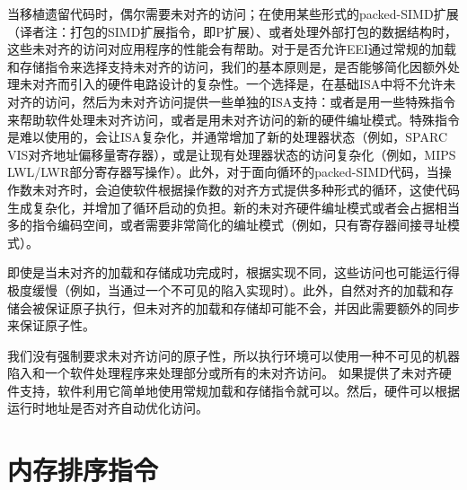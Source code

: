 \begin{commentary}

  当移植遗留代码时，偶尔需要未对齐的访问；在使用某些形式的packed-SIMD扩展（译者注：打包的SIMD扩展指令，即P扩展）、或者处理外部打包的数据结构时，这些未对齐的访问对应用程序的性能会有帮助。对于是否允许EEI通过常规的加载和存储指令来选择支持未对齐的访问，我们的基本原则是，是否能够简化因额外处理未对齐而引入的硬件电路设计的复杂性。一个选择是，在基础ISA中将不允许未对齐的访问，然后为未对齐访问提供一些单独的ISA支持：或者是用一些特殊指令来帮助软件处理未对齐访问，或者是用未对齐访问的新的硬件编址模式。特殊指令是难以使用的，会让ISA复杂化，并通常增加了新的处理器状态（例如，SPARC VIS对齐地址偏移量寄存器），或是让现有处理器状态的访问复杂化（例如，MIPS LWL/LWR部分寄存器写操作）。此外，对于面向循环的packed-SIMD代码，当操作数未对齐时，会迫使软件根据操作数的对齐方式提供多种形式的循环，这使代码生成复杂化，并增加了循环启动的负担。新的未对齐硬件编址模式或者会占据相当多的指令编码空间，或者需要非常简化的编址模式（例如，只有寄存器间接寻址模式）。
\end{commentary}

即使是当未对齐的加载和存储成功完成时，根据实现不同，这些访问也可能运行得极度缓慢（例如，当通过一个不可见的陷入实现时）。此外，自然对齐的加载和存储会被保证原子执行，但未对齐的加载和存储却可能不会，并因此需要额外的同步来保证原子性。


\begin{commentary}

  我们没有强制要求未对齐访问的原子性，所以执行环境可以使用一种不可见的机器陷入和一个软件处理程序来处理部分或所有的未对齐访问。
  如果提供了未对齐硬件支持，软件利用它简单地使用常规加载和存储指令就可以。然后，硬件可以根据运行时地址是否对齐自动优化访问。
\end{commentary}

\pagebreak

\section{内存排序指令}
\label{sec:fence}

